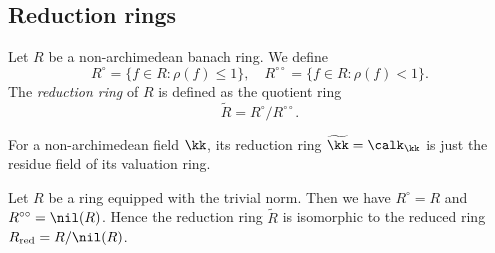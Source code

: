 \subsection{Reduction rings}

    \begin{definition}\label{def:reduction_ring_of_nonarchimedean_banach_ring}
        Let \(R\) be a non-archimedean banach ring.
        We define 
        \[
            R^\circ = \{ f \in R : \rho(f) \leq 1 \}, \quad R^{\circ \circ} = \{ f \in R : \rho(f) < 1 \}.
        \]
        The \emph{reduction ring} of \(R\) is defined as the quotient ring
        \[ \widetilde{R} = R^\circ / R^{\circ \circ}. \]
    \end{definition}

    For a non-archimedean field \(\kk\), its reduction ring \(\widetilde{\kk} = \calk_\kk\) is just the residue field of its valuation ring.
    
    \begin{example}\label{eg:reduction_ring_of_trivial_normed_rings}
        Let \(R\) be a ring equipped with the trivial norm.
        Then we have \(R^\circ = R\) and \(R^{\circ \circ} = \nil(R)\).
        Hence the reduction ring \(\widetilde{R}\) is isomorphic to the reduced ring \(R_{\text{red}} = R/\nil(R)\).
    \end{example}

    


